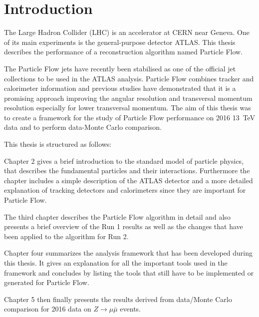 \chapter{Introduction}
\label{sec:intro}

The Large Hadron Collider (LHC) is an accelerator at CERN near Geneva. One of its main experiments is the general-purpose detector ATLAS. This thesis describes the performance of a reconstruction algorithm named Particle Flow.


The Particle Flow jets have recently been stabilised as one of the official jet collections to be used in the ATLAS analysis. Particle Flow combines tracker and calorimeter information and previous studies\cite{pflow16} have demonstrated that it is a promising approach improving the angular resolution and transversal momentum resolution especially for lower transversal momentum. The aim of this thesis was to create a framework for the study of Particle Flow performance on 2016 \SI{13}{\TeV} data and to perform data-Monte Carlo comparison.

This thesis is structured as follows:

Chapter 2 gives a brief introduction to the standard model of particle physics, that describes the fundamental particles and their interactions. Furthermore the chapter includes a simple description of the ATLAS detector and a more detailed explanation of tracking detectors and calorimeters since they are important for Particle Flow.

The third chapter describes the Particle Flow algorithm in detail and also presents a brief overview of the Run 1 results as well as the changes that have been applied to the algorithm for Run 2.

Chapter four summarizes the analysis framework that has been developed during this thesis. It gives an explanation for all the important tools used in the framework and concludes by listing the tools that still have to be implemented or generated for Particle Flow.

Chapter 5 then finally presents the results derived from data/Monte Carlo comparison for 2016 data on $Z\rightarrow \mu \bar{\mu}$ events.





